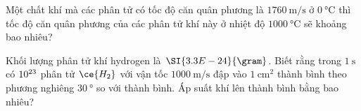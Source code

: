\begin{ex}
	Một chất khí mà các phân tử có tốc độ căn quân phương là $\SI{1760}{\meter/\second}$ ở $\SI{0}{\celsius}$ thì tốc độ căn quân phương của các phân tử khí này ở nhiệt độ $\SI{1000}{\celsius}$ sẽ khoảng bao nhiêu?
	
\end{ex}
\begin{ex}
	Khối lượng phân tử khí hydrogen là $\SI{3.3E-24}{\gram}$. Biết rằng trong $\SI{1}{\second}$ có $\SI{E23}{}$ phân tử $\ce{H_2}$ với vận tốc $\SI{1000}{\meter/\second}$ đập vào $\SI{1}{\centi\meter^2}$ thành bình theo phương nghiêng $\SI{30}{\degree}$ so với thành bình. Áp suất khí lên thành bình bằng bao nhiêu?
	
\end{ex}
